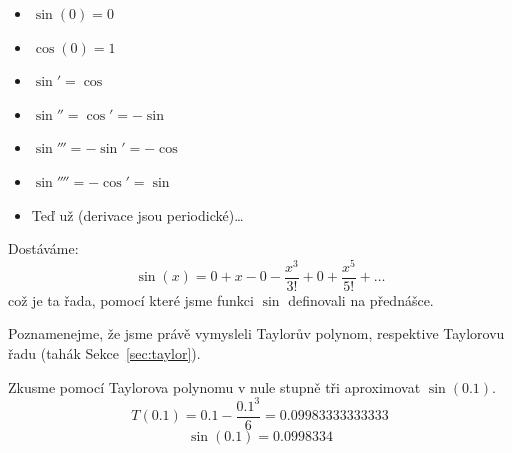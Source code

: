 \begin{enumerate}
\begin{enumerate}
{\begin{itemize}
						\item  $\sin(0) = 0$
						
						\item  $\cos(0) = 1$

						\item  $\sin' = \cos$

						\item  $\sin'' = \cos' = -\sin$

						\item  $\sin''' = -\sin' = -\cos$

						\item  $\sin'''' = -\cos' = \sin$

						\item  Teď už  (derivace jsou periodické)\ldots

					\end{itemize}

					Dostáváme:
					$$\sin(x) = 0 + x - 0 - \frac{x^3}{3!} + 0 + \frac{x^5}{5!} + \ldots$$
					což je ta řada, pomocí které jsme funkci $\sin$ definovali na přednášce.
				}

		\end{enumerate}

		Poznamenejme, že jsme právě vymysleli Taylorův polynom, respektive Taylorovu řadu (tahák Sekce~\ref{sec:taylor}).

		Zkusme pomocí Taylorova polynomu v nule stupně tři aproximovat $\sin(0.1)$.
		$$T(0.1) = 0.1 - \frac{0.1^3}{6} = 0.09983333333333$$
		$$\sin(0.1) = 0.0998334$$


\end{enumerate}
